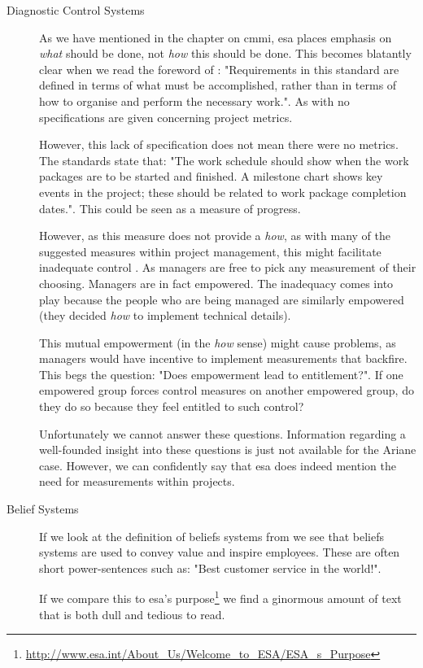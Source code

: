 \begin{description}
\item[Diagnostic Control Systems] 
As we have mentioned in the chapter on \ac{cmmi}, \ac{esa} places emphasis on \textit{what} should be done, not \textit{how} this should be done. This becomes blatantly clear when we read the foreword of \citep[3]{ecsQ80a}: "Requirements in this standard are defined in terms of what must be accomplished, rather than in terms of how to organise and perform the necessary work.". As with \citep{esaSEstandards1991} no specifications are given concerning project metrics.

However, this lack of specification does not mean there were no metrics. The standards state that: "The work schedule should show when the work packages are to be started and finished. A milestone chart shows key events in the project; these should be related to work package completion dates.". This could be seen as a measure of progress.

However, as this measure does not provide a \textit{how}, as with many of the suggested measures within project management, this might facilitate inadequate control \citep{simons1995control}. As managers are free to pick any measurement of their choosing. Managers are in fact empowered. The inadequacy comes into play because the people who are being managed are similarly empowered (they decided \textit{how} to implement technical details).

This mutual empowerment (in the \textit{how} sense) might cause problems, as managers would have incentive to implement measurements that backfire. 
This begs the question: "Does empowerment lead to entitlement?". If one empowered group forces control measures on another empowered group, do they do so because they feel entitled to such control?

Unfortunately we cannot answer these questions. Information regarding a well-founded insight into these questions is just not available for the Ariane case. However, we can confidently say that \ac{esa} does indeed mention the need for measurements within projects.

\item[Belief Systems]
If we look at the definition of beliefs systems from \citep{simons1995control} we see that beliefs systems are used to convey value and inspire employees. These are often short power-sentences such as: "Best customer service in the world!".

If we compare this to \ac{esa}'s purpose\footnote{\url{http://www.esa.int/About_Us/Welcome_to_ESA/ESA_s_Purpose}} we find a ginormous amount of text that is both dull and tedious to read.


\end{description}
